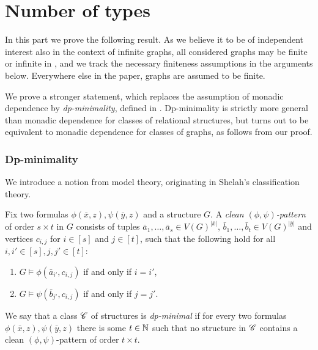 \part{Number of types}\label{part:types}
In this part we prove the following result.
As we believe it to be of independent interest also in the context of infinite graphs,
all considered graphs may be finite or infinite in ,
and we track the necessary finiteness assumptions in the arguments below.
Everywhere else in the paper, graphs are assumed to be finite.

{\typeboundgeneraltrue\thmtypes*}


We prove a stronger statement, which replaces the assumption of monadic dependence by \emph{dp-minimality}, defined in . Dp-minimality is strictly more general than monadic dependence for classes of relational structures, but turns out to be equivalent to monadic dependence for classes of graphs, as follows from our proof.





\section{Dp-minimality}\label{sec:dp-min}
We introduce a notion from model theory, originating in Shelah's classification theory.

Fix two formulas $\phi(\bar x,z),\psi(\bar y,z)$ and a structure $G$.
A \emph{clean $(\phi,\psi)$-pattern} of order $s\times t$ in $G$ consists of tuples 
$\bar a_1,\ldots,\bar a_s\in V(G)^{|\bar x|}$, $\bar b_1,\ldots,\bar b_t\in V(G)^{|\bar y|}$
and vertices $c_{i,j}$ for $i\in[s]$ and $j\in[t]$,
such that the following hold for all $i,i'\in[s],j,j'\in[t]$:
\begin{enumerate}
    \item $G\models \phi(\bar a_{i'},c_{i,j})$ if and only if $i=i'$,
    \item $G\models \psi(\bar b_{j'},c_{i,j})$ if and only if $j=j'$.
\end{enumerate}

\begin{definition}
We say that a class $\mathscr C$ of structures is \emph{dp-minimal}
if for every two formulas $\phi(\bar x,z),\psi(\bar y,z)$ there is some $t\in\mathbb N$ 
such that no structure in $\mathscr C$ contains a clean $(\phi,\psi)$-pattern of order $t\times t$.
\end{definition}



